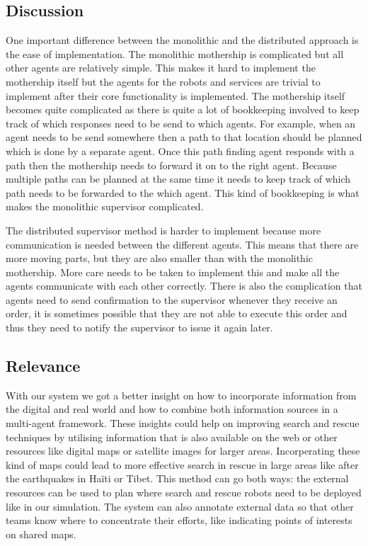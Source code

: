 \subsection{Discussion}

One important difference between the monolithic and the distributed approach is
the ease of implementation. The monolithic mothership is complicated but all
other agents are relatively simple. This makes it hard to implement the
mothership itself but the agents for the robots and services are trivial to
implement after their core functionality is implemented. The mothership itself
becomes quite complicated as there is quite a lot of bookkeeping involved to
keep track of which responses need to be send to which agents. For example,
when an agent needs to be send somewhere then a path to that location should
be planned which is done by a separate agent. Once this path finding agent
responds with a path then the mothership needs to forward it on to the right
agent. Because multiple paths can be planned at the same time it needs to keep
track of which path needs to be forwarded to the which agent. This kind of
bookkeeping is what makes the monolithic supervisor complicated.

The distributed supervisor method is harder to implement because more
communication is needed between the different agents. This means that there are
more moving parts, but they are also smaller than with the monolithic
mothership. More care needs to be taken to implement this and make all the
agents communicate with each other correctly. There is also the complication
that agents need to send confirmation to the supervisor whenever they receive
an order, it is sometimes possible that they are not able to execute this order
and thus they need to notify the supervisor to issue it again later.

\subsection{Relevance}

With our system we got a better insight on how to incorporate information from
the digital and real world and how to combine both information sources in a
multi-agent framework. These insights could help on improving search and rescue
techniques by utilising information that is also available on the web or other
resources like digital maps or satellite images for larger areas. Incorperating
these kind of maps could lead to more effective search in rescue in large areas
like after the earthquakes in Ha\"iti or Tibet. This method can go both ways:
the external resources can be used to plan where search and rescue robots need
to be deployed like in our simulation. The system can also annotate external
data so that other teams know where to concentrate their efforts, like
indicating points of interests on shared maps.

